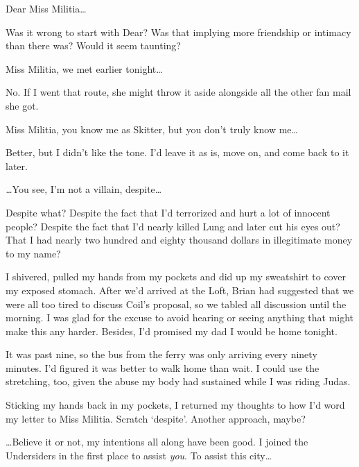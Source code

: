 





Dear Miss Militia\ldots



Was it wrong to start with Dear?  Was that implying more friendship or intimacy than there was?  Would it seem taunting?



Miss Militia, we met earlier tonight\ldots



No.  If I went that route, she might throw it aside alongside all the other fan mail she got.



Miss Militia, you know me as Skitter, but you don't truly know me\ldots



Better, but I didn't like the tone.  I'd leave it as is, move on, and come back to it later.



\emph{\ldots}You see, I'm not a villain, despite\ldots



Despite what?  Despite the fact that I'd terrorized and hurt a lot of innocent people?  Despite the fact that I'd nearly killed Lung and later cut his eyes out?  That I had nearly two hundred and eighty thousand dollars in illegitimate money to my name?



I shivered, pulled my hands from my pockets and did up my sweatshirt to cover my exposed stomach.  After we'd arrived at the Loft, Brian had suggested that we were all too tired to discuss Coil's proposal, so we tabled all discussion until the morning.  I was glad for the excuse to avoid hearing or seeing anything that might make this any harder.  Besides, I'd promised my dad I would be home tonight.



It was past nine, so the bus from the ferry was only arriving every ninety minutes.  I'd figured it was better to walk home than wait.  I could use the stretching, too, given the abuse my body had sustained while I was riding Judas.



Sticking my hands back in my pockets, I returned my thoughts to how I'd word my letter to Miss Militia.  Scratch `despite'.  Another approach, maybe?



\ldots{}Believe it or not, my intentions all along have been good.  I joined the Undersiders in the first place to assist \emph{you}.  To assist this city\ldots




